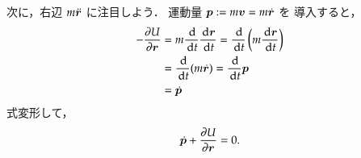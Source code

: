             次に，右辺 $m\ddot{\boldsymbol{r}}$ に注目しよう．
            運動量 $\boldsymbol{p} := m\boldsymbol{v} = m\dot{\boldsymbol{r}}$ を
            導入すると，
                \begin{align}
                    -\frac{\partial U}{\partial \boldsymbol{r}} &= m \frac{\,\mathrm{d}}{\,\mathrm{d} t} \frac{\,\mathrm{d} \boldsymbol{r}}{\,\mathrm{d} t}
                                           = \frac{\,\mathrm{d}}{\,\mathrm{d} t} \left( m \frac{\,\mathrm{d} \boldsymbol{r}}{\,\mathrm{d} t}\right)
                                           \notag \\
                                           &= \frac{\,\mathrm{d}}{\,\mathrm{d} t} (m\dot{\boldsymbol{r}})
                                           = \frac{\,\mathrm{d}}{\,\mathrm{d} t} \boldsymbol{p}
                                           \notag \\
                                           &= \dot{\boldsymbol{p}}
                \end{align}
            式変形して，
                \begin{align}\label{eq:LagEq001}
                    \dot{\bp} + \frac{\rd U}{\rd \br} = 0.
                \end{align}

